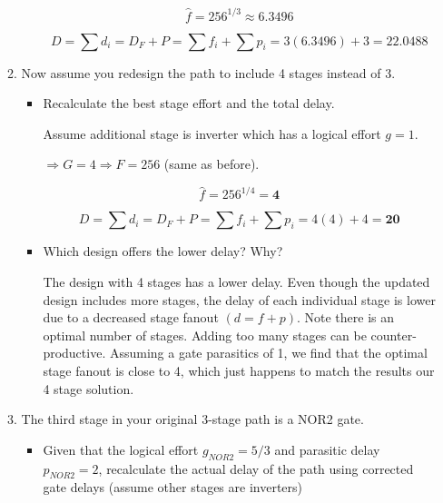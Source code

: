 \documentclass[fleqn]{article}
\begin{document}
\begin{enumerate}
\begin{enumerate}
\begin{itemize}
				\begin{equation*}
					\hat{f} = 256^{1/3} \approx \mathbf{6.3496}
				\end{equation*}
					
				\begin{equation*}
					D = \sum{d_i} = D_F + P = \sum{f_i} + \sum{p_i} = 3(6.3496) + 3 = \mathbf{22.0488}
				\end{equation*}	
					
			\end{itemize}
			
			\item Now assume you redesign the path to include 4 stages instead of 3.
			
			\begin{itemize}
				\item Recalculate the best stage effort and the total delay.
				
					Assume additional stage is inverter which has a logical effort $g = 1$.
					
					$\Rightarrow G = 4 \Rightarrow F = 256$ (same as before).
					
					\begin{equation*}
						\hat{f} = 256^{1/4} = \mathbf{4}
					\end{equation*}
					
					\begin{equation*}
						D = \sum{d_i} = D_F + P = \sum{f_i} + \sum{p_i} = 4(4) + 4 = \mathbf{20}
					\end{equation*}	
				
				\item Which design offers the lower delay? Why?
				
				The design with 4 stages has a lower delay. Even though the updated design includes more stages, the delay of each individual stage is lower due to a decreased stage fanout $(d = f + p)$. Note there is an optimal number of stages. Adding too many stages can be counter-productive. Assuming a gate parasitics of 1, we find that the optimal stage fanout is close to 4, which just happens to match the results our 4 stage solution.
				
			\end{itemize}
			
			\item The third stage in your original 3-stage path is a NOR2 gate.
			
			\begin{itemize}
				\item Given that the logical effort $g_{NOR2} = 5/3$ and parasitic delay $p_{NOR2} = 2$, recalculate the actual delay of the path using corrected gate delays (assume other stages are inverters)
				

\end{itemize}
\end{enumerate}
\end{enumerate}
\end{document}
